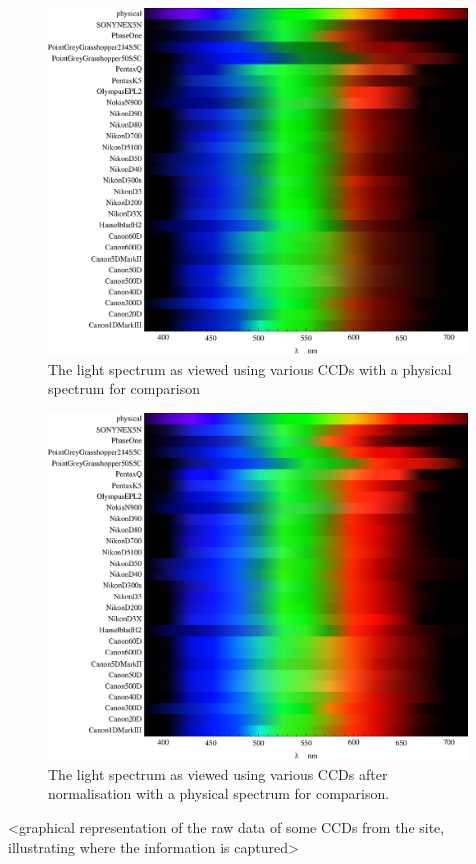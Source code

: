 \begin{figure}[h!]
  \centering
    \includegraphics[width=0.99\textwidth]{Chapter1/Figs/ResponseSpectraStripes.eps}
    \caption{The light spectrum as viewed using various CCDs with a physical spectrum for comparison }  \label{fig:ResponseSpectraStripes}
\end{figure}

\begin{figure}[h!]
  \centering
    \includegraphics[width=0.99\textwidth]{Chapter1/Figs/ResponseSpectraStripesNorm.eps}
    \caption{The light spectrum as viewed using various CCDs after normalisation with a physical spectrum for comparison.}  \label{fig:ResponseSpectraStripesNorm}
\end{figure}
<graphical representation of the raw data of some CCDs from the site, illustrating where the information is captured>

